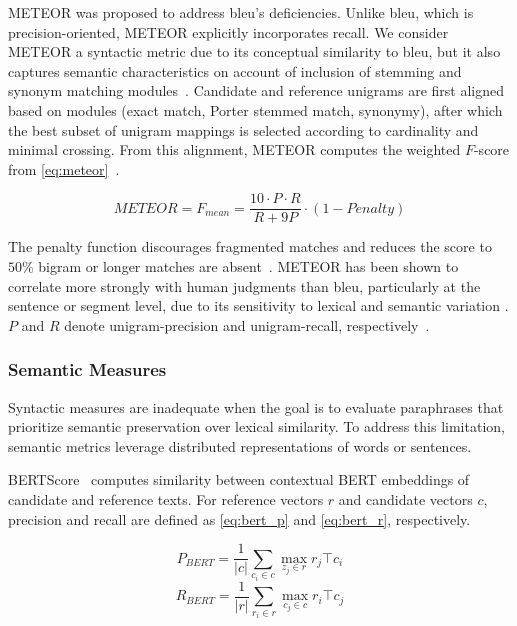 METEOR was proposed to address \ac{bleu}'s deficiencies. 
Unlike \ac{bleu}, which is precision-oriented, METEOR explicitly incorporates recall.
We consider METEOR a syntactic metric due to its conceptual similarity to \ac{bleu}, but it also captures semantic characteristics on account of inclusion of stemming and synonym matching modules~\citep{kurt_pehlivanoglu_comparative_2024}. 
Candidate and reference unigrams are first aligned based on modules (exact match, Porter stemmed match, synonymy), after which the best subset of unigram mappings is selected according to cardinality and minimal crossing. 
From this alignment, METEOR computes the weighted $F$-score from \autoref{eq:meteor}~\citep{banerjee_METEOR_2005}.

\begin{equation}
    METEOR = F_{mean} = \frac{10 \cdot P \cdot R}{R + 9P} \cdot (1 - Penalty)
\label{eq:meteor}
\end{equation}

The penalty function discourages fragmented matches and reduces the score to $50\%$ bigram or longer matches are absent~\citep{banerjee_METEOR_2005}. 
METEOR has been shown to correlate more strongly with human judgments than \ac{bleu}, particularly at the sentence or segment level, due to its sensitivity to lexical and semantic variation \citep{zhou_paraphrase_2021,kurt_pehlivanoglu_comparative_2024}.
$P$ and $R$ denote unigram-precision and unigram-recall, respectively~\citep{kurt_pehlivanoglu_comparative_2024,banerjee_METEOR_2005}.


\subsubsection{Semantic Measures}
Syntactic measures are inadequate when the goal is to evaluate paraphrases that prioritize semantic preservation over lexical similarity. 
To address this limitation, semantic metrics leverage distributed representations of words or sentences.

BERTScore~\citep{hanna_fine_grained_2021} computes similarity between contextual BERT embeddings of candidate and reference texts. 
For reference vectors $r$ and candidate vectors $c$, precision and recall are defined as \autoref{eq:bert_p} and \autoref{eq:bert_r}, respectively.

\begin{equation}
    P_{BERT} = \frac{1}{|c|} \sum_{c_i \in c} \max_{z_j \in r} r_j\top c_i
\label{eq:bert_p}
\end{equation}
\begin{equation}
    R_{BERT} = \frac{1}{|r|} \sum_{r_i \in r} \max_{c_j \in c} r_i\top c_j
\label{eq:bert_r}
\end{equation}

